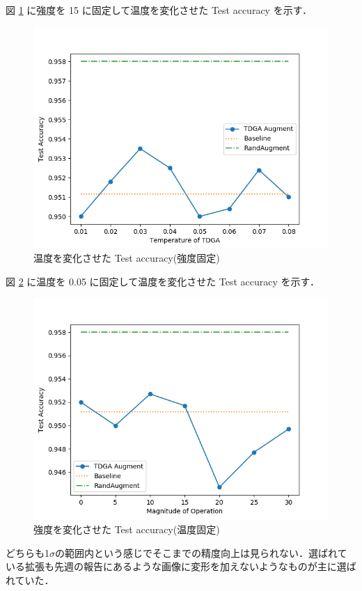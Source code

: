 \documentclass[onecolumn]{ujarticle}   %
\begin{document}
  図 \ref{fig:exp_change_temperature} に強度を 15 に固定して温度を変化させた Test accuracy を示す．
  \begin{figure}[ht]
    \begin{center}
      \includegraphics[width=0.7\columnwidth]{exp_change_temperature.png}
      \caption{温度を変化させた Test accuracy(強度固定)}
      \label{fig:exp_change_temperature}
    \end{center}
  \end{figure}


  図 \ref{fig:exp_change_mag} に温度を 0.05 に固定して温度を変化させた Test accuracy を示す．
  \begin{figure}[ht]
    \begin{center}
      \includegraphics[width=0.7\columnwidth]{exp_change_mag.png}
      \caption{強度を変化させた Test accuracy(温度固定)}
      \label{fig:exp_change_mag}
    \end{center}
  \end{figure}

  どちらも1$\sigma$の範囲内という感じでそこまでの精度向上は見られない．選ばれている拡張も先週の報告にあるような画像に変形を加えないようなものが主に選ばれていた．
\end{document}
